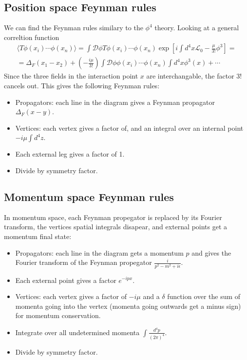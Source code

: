 \documentclass{article}
\begin{document}
\subsection{Position space Feynman rules}
We can find the Feynman rules similary to the $\phi^4$ theory. Looking at a general correltion function
\begin{equation}
\begin{gathered}
    \langle T \phi(x_i) \cdots \phi(x_n) \rangle = \int \mathcal{D}\phi T \phi(x_i) \cdots \phi(x_n) \exp[i \int d^4x \mathcal{L}_0 - \frac{\mu}{3!}\phi^3] = \\ =
    \Delta_F(x_1 - x_2) + \left(-\frac{i\mu}{3!}\right) \int \mathcal{D}\phi \phi(x_i) \cdots \phi(x_n) \int d^4x \phi^3(x) + \cdots
\end{gathered}
\end{equation}
Since the three fields in the interaction point $x$ are interchangable, the factor $3!$ cancels out. This gives the following Feynman rules:
\begin{itemize}
    \item Propagators: each line in the diagram gives a Feynman propagator $\Delta_F(x - y)$.
    \item Vertices: each vertex gives a factor of, and an integral over an internal point $-i\mu \int d^4z$.
    \item Each external leg gives a factor of 1.
    \item Divide by symmetry factor.
\end{itemize}
\subsection{Momentum space Feynman rules}
In momentum space, each Feynman propegator is replaced by its Fourier transform, the vertices spatial integrals disapear, and external points get a momentum final state:
\begin{itemize}
    \item Propagators: each line in the diagram gets a momentum $p$ and gives the Fourier transform of the Feynman propegator $\frac{i}{p^2 - m^2 + i\epsilon}$.
    \item Each external point gives a factor $e^{-ipx}$.
    \item Vertices: each vertex gives a factor of $-i\mu$ and a $\delta$ function over the sum of momenta going into the vertex (momenta going outwards get a minus sign) for momentum conservation.
    \item Integrate over all undetermined momenta $\int \frac{d^4p}{(2\pi)^4}$.
    \item Divide by symmetry factor.
\end{itemize}
\end{document}
